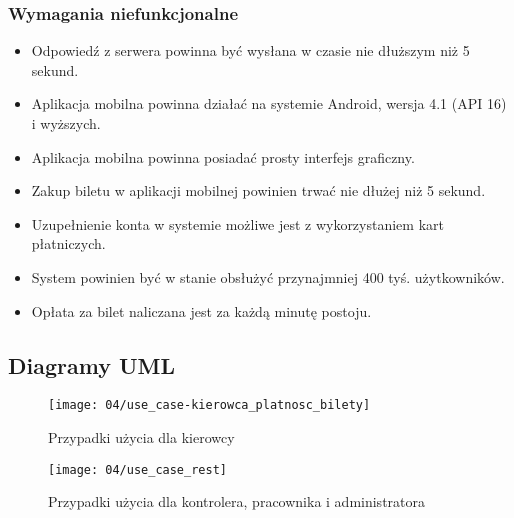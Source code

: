 \subsubsection*{Wymagania niefunkcjonalne}

\begin{itemize}
	\item Odpowiedź z serwera powinna być wysłana w czasie nie dłuższym niż 5 sekund.
	\item Aplikacja mobilna powinna działać na systemie Android, wersja 4.1 (API 16) i wyższych.
	\item Aplikacja mobilna powinna posiadać prosty interfejs graficzny.
	\item Zakup biletu w aplikacji mobilnej powinien trwać nie dłużej niż 5 sekund.
	\item Uzupełnienie konta w systemie możliwe jest z wykorzystaniem kart płatniczych.
	\item System powinien być w stanie obsłużyć przynajmniej 400 tyś. użytkowników.
	\item Opłata za bilet naliczana jest za każdą minutę postoju.
\end{itemize}


\newpage
\subsection{Diagramy UML}


\begin{figure}[h]
	\begin{center}
		\texttt{[image: 04/use\_case-kierowca\_platnosc\_bilety]}
	\end{center}
	\caption{Przypadki użycia dla kierowcy}
\end{figure}

\begin{figure}[p]
	\begin{center}
		\texttt{[image: 04/use\_case\_rest]}
	\end{center}
	\caption{Przypadki użycia dla kontrolera, pracownika i administratora}
\end{figure}

